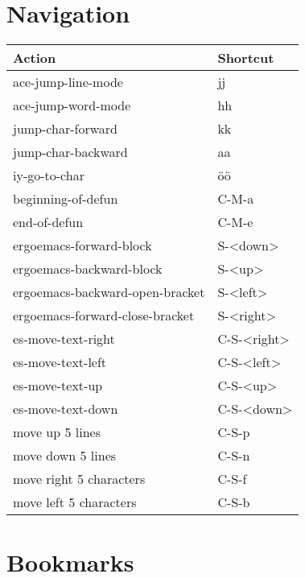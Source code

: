 \documentclass[english]{rcalibrionecolumn}
\begin{document}
\section{Navigation}
\label{sec-3}


\begin{center}
\begin{tabular}{ll}
 \textbf{Action}                  &  \textbf{Shortcut}  \\
\hline
 ace-jump-line-mode               &  jj                 \\
 ace-jump-word-mode               &  hh                 \\
 jump-char-forward                &  kk                 \\
 jump-char-backward               &  aa                 \\
 iy-go-to-char                    &  öö                 \\
 beginning-of-defun               &  C-M-a              \\
 end-of-defun                     &  C-M-e              \\
\hline
 ergoemacs-forward-block          &  S-<down>           \\
 ergoemacs-backward-block         &  S-<up>             \\
 ergoemacs-backward-open-bracket  &  S-<left>           \\
 ergoemacs-forward-close-bracket  &  S-<right>          \\
\hline
 es-move-text-right               &  C-S-<right>        \\
 es-move-text-left                &  C-S-<left>         \\
 es-move-text-up                  &  C-S-<up>           \\
 es-move-text-down                &  C-S-<down>         \\
\hline
 move up 5 lines                  &  C-S-p              \\
 move down 5 lines                &  C-S-n              \\
 move right 5 characters          &  C-S-f              \\
 move left 5 characters           &  C-S-b              \\
\end{tabular}
\end{center}
\section{Bookmarks}
\label{sec-4}
\end{document}
